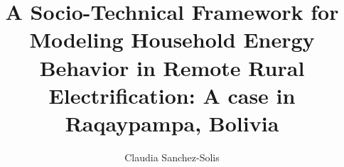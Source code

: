 \documentclass[final,3p,times,onecolumn]{elsarticle}
\begin{document}
 

\begin{frontmatter}





\title{A Socio-Technical Framework for Modeling Household Energy Behavior in Remote Rural Electrification: A case in Raqaypampa, Bolivia}


\author[inst1,inst2]{Claudia Sanchez-Solis}



\end{frontmatter}
\end{document}

